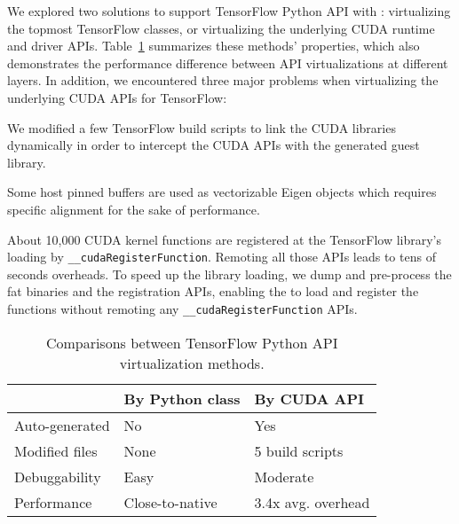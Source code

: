 We explored two solutions to support TensorFlow Python API with \AvA:
virtualizing the topmost TensorFlow classes,
or virtualizing the underlying CUDA runtime and driver APIs.
Table~\ref{tab:tensorflow_cmp} summarizes these methods' properties,
which also demonstrates the performance difference between API virtualizations at different layers.
In addition, we encountered three major problems when virtualizing the underlying CUDA APIs for TensorFlow:

We modified a few TensorFlow build scripts to link the CUDA libraries dynamically
in order to intercept the CUDA APIs with the generated guest library.

Some host pinned buffers are used as vectorizable Eigen objects which requires specific alignment for the sake of performance.

About 10,000 CUDA kernel functions are registered at the TensorFlow library's loading by \lstinline|__cudaRegisterFunction|.
Remoting all those APIs leads to tens of seconds overheads.
To speed up the library loading, we dump and pre-process the fat binaries and the registration APIs,
enabling the \worker to load and register the functions without remoting any \lstinline|__cudaRegisterFunction| APIs.

\begin{table}[!thp]
	\centering
	\begin{tabular}{l|l|l}
		& By Python class & By CUDA API \\ \hline
		Auto-generated & No   & Yes \\ \hline
		Modified files & None & 5 build scripts \\ \hline
		Debuggability  & Easy & Moderate \\ \hline
		Performance    & Close-to-native & 3.4x avg. overhead \\ \hline
	\end{tabular}
	\caption{Comparisons between TensorFlow Python API virtualization methods.}
	\label{tab:tensorflow_cmp}
\end{table}

